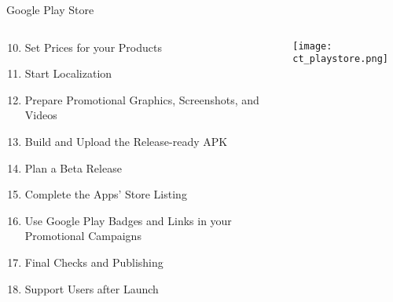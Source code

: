 \begin{frame}{Google Play Store}

  \begin{columns}[T] %
     \begin{column}[T]{0.55\textwidth} %


     \begin{enumerate}
     \setcounter{enumi}{9}

\item Set Prices for your Products
\item Start Localization
\item Prepare Promotional Graphics, Screenshots, and Videos
\item Build and Upload the Release-ready APK
\item Plan a Beta Release
\item Complete the Apps’ Store Listing
\item Use Google Play Badges and Links in your Promotional Campaigns
\item Final Checks and Publishing
\item Support Users after Launch

     \end{enumerate}


     \end{column}
     \begin{column}[T]{0.45\textwidth} %

\texttt{[image: ct\_playstore.png]}

     \end{column}
     \end{columns}

\end{frame}

